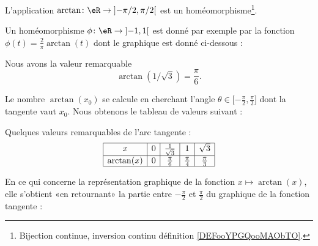 \begin{lemma}		\label{LEMooHJEKooARZMil}
	L'application \(\arctan \colon \eR\to \mathopen] -\pi/2,\pi/2\mathclose[  \) est un homéomorphisme\footnote{Bijection continue, inversion continu définition \ref{DEFooYPGQooMAObTO}.}.
\end{lemma}

\begin{example}
	Un homéomorphisme \( \phi\colon \eR\to \mathopen] -1 , 1 \mathclose[\) est donné par exemple par la fonction \( \phi(t)=\frac{ 2 }{ \pi }\arctan(t)\) dont le graphique est donné ci-dessous :

	\begin{center}
		
	\end{center}
\end{example}

\begin{lemma}       \label{LEMooJKIUooEMMOrs}
	Nous avons la valeur remarquable
	\begin{equation}
		\arctan(1/\sqrt{ 3 })=\frac{ \pi }{ 6 }.
	\end{equation}
\end{lemma}

Le nombre \( \arctan(x_0)\) se calcule en cherchant l'angle \( \theta\in\mathopen[ -\frac{ \pi }{2} , \frac{ \pi }{2} \mathclose]\) dont la tangente vaut \( x_0\). Nous obtenons le tableau de valeurs suivant :

\begin{lemma}       \label{LEMooPQNCooDkEUyw}
	Quelques valeurs remarquables de l'arc tangente :
	\begin{equation}
		\begin{array}[]{|c|c|c|c|c|}
			\hline
			x          & 0 & \frac{1}{ \sqrt{3} } & 1                 & \sqrt{3}          \\
			\hline
			\arctan(x) & 0 & \frac{ \pi }{ 6 }    & \frac{ \pi }{ 4 } & \frac{ \pi }{ 3 } \\
			\hline
		\end{array}
	\end{equation}
\end{lemma}

En ce qui concerne la représentation graphique de la fonction \( x\mapsto\arctan(x)\), elle s'obtient «en retournant» la partie entre \( -\frac{ \pi }{2}\) et \( \frac{ \pi }{ 2 }\) du graphique de la fonction tangente :
\begin{center}
	
\end{center}

